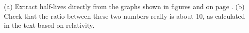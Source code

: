 (a) Extract half-lives directly from the graphs shown in figures
 and  on page \pageref{fig:muona}.\answercheck\hwendpart
(b) Check that the ratio between these two numbers really is
about 10, as calculated in the text based on relativity.
